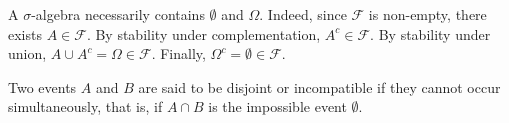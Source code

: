 \begin{remark}
A $\sigma$-algebra necessarily contains $\emptyset$ and $\Omega$.
Indeed, since $\mathcal{F}$ is non-empty, there exists $A \in \mathcal{F}$. By stability under complementation, $A^c \in \mathcal{F}$. By stability under union, $A \cup A^c = \Omega \in \mathcal{F}$. Finally, $\Omega^c = \emptyset \in \mathcal{F}$.
\end{remark}
\begin{remark}[Reminder]
Two events $A$ and $B$ are said to be disjoint or incompatible if they cannot occur simultaneously, that is, if $A \cap B$ is the impossible event $\emptyset$.
\end{remark}%
